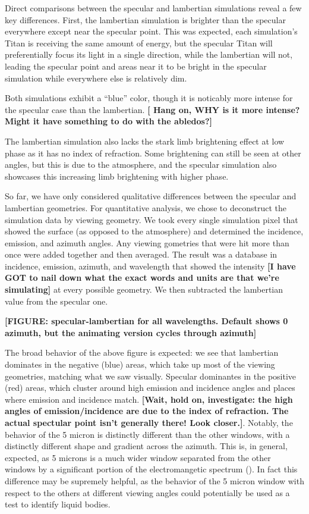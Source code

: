\documentclass{article}
\begin{document}
Direct comparisons between the specular and lambertian simulations reveal a few key differences. First, the lambertian simulation is brighter than the specular everywhere except near the specular point. This was expected, each simulation's Titan is receiving the same amount of energy, but the specular Titan will preferentially focus its light in a single direction, while the lambertian will not, leading the specular point and areas near it to be bright in the specular simulation while everywhere else is relatively dim. 

Both simulations exhibit a ``blue'' color, though it is noticably more intense for the specular case than the lambertian. \textbf{\color{red}[ Hang on, WHY is it more intense? Might it have something to do with the abledos?]\color{black}}

The lambertian simulation also lacks the stark limb brightening effect at low phase as it has no index of refraction. Some brightening can still be seen at other angles, but this is due to the atmosphere, and the specular simulation also showcases this increasing limb brightening with higher phase.

So far, we have only considered qualitative differences between the specular and lambertian geometries. For quantitative analysis, we chose to deconstruct the simulation data by viewing geometry. We took every single simulation pixel that showed the surface (as opposed to the atmosphere) and determined the incidence, emission, and azimuth angles. Any viewing gometries that were hit more than once were added together and then averaged. The result was a database in incidence, emission, azimuth, and wavelength that showed the intensity \textbf{\color{red}[I have GOT to nail down what the exact words and units are that we're simulating]\color{black}} at every possible geometry. We then subtracted the lambertian value from the specular one.

\textbf{\color{red} [FIGURE: specular-lambertian for all wavelengths. Default shows 0 azimuth, but the animating version cycles through azimuth] \color{black}}

The broad behavior of the above figure is expected: we see that lambertian dominates in the negative (blue) areas, which take up most of the viewing geometries, matching what we saw visually. Specular dominantes in the positive (red) areas, which cluster around high emission and incidence angles and places where emission and incidence match. \textbf{\color{red}[Wait, hold on, investigate: the high angles of emission/incidence are due to the index of refraction. The actual spectular point isn't generally there! Look closer.]\color{black}}. Notably, the behavior of the 5 micron is distinctly different than the other windows, with a distinctly different shape and gradient across the azimuth. This is, in general, expected, as 5 microns is a much wider window separated from the other windows by a significant portion of the electromangetic spectrum (). In fact this difference may be supremely helpful, as the behavior of the 5 micron window with respect to the others at different viewing angles could potentially be used as a test to identify liquid bodies. 
\end{document}
